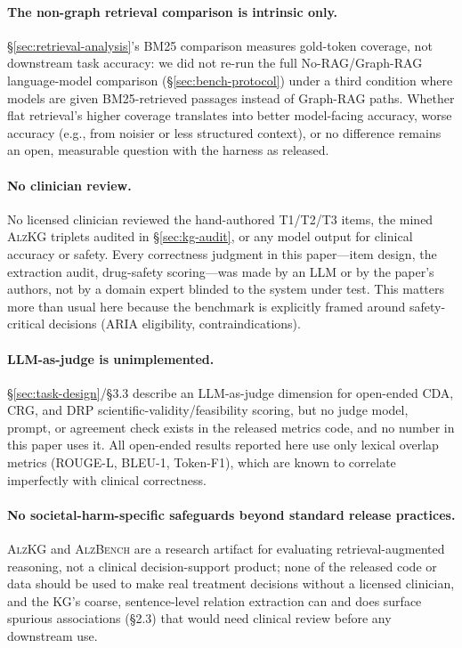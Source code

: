 \documentclass{article}
\begin{document}
\paragraph{The non-graph retrieval comparison is intrinsic only.} \S\ref{sec:retrieval-analysis}'s BM25 comparison measures gold-token coverage, not downstream task accuracy: we did not re-run the full No-RAG/Graph-RAG language-model comparison (\S\ref{sec:bench-protocol}) under a third condition where models are given BM25-retrieved passages instead of Graph-RAG paths. Whether flat retrieval's higher coverage translates into better model-facing accuracy, worse accuracy (e.g., from noisier or less structured context), or no difference remains an open, measurable question with the harness as released.

\paragraph{No clinician review.} No licensed clinician reviewed the hand-authored T1/T2/T3 items, the mined \textsc{AlzKG} triplets audited in \S\ref{sec:kg-audit}, or any model output for clinical accuracy or safety. Every correctness judgment in this paper---item design, the extraction audit, drug-safety scoring---was made by an LLM or by the paper's authors, not by a domain expert blinded to the system under test. This matters more than usual here because the benchmark is explicitly framed around safety-critical decisions (ARIA eligibility, contraindications).

\paragraph{LLM-as-judge is unimplemented.} \S\ref{sec:task-design}/\S3.3 describe an LLM-as-judge dimension for open-ended CDA, CRG, and DRP scientific-validity/feasibility scoring, but no judge model, prompt, or agreement check exists in the released metrics code, and no number in this paper uses it. All open-ended results reported here use only lexical overlap metrics (ROUGE-L, BLEU-1, Token-F1), which are known to correlate imperfectly with clinical correctness.

\paragraph{No societal-harm-specific safeguards beyond standard release practices.} \textsc{AlzKG} and \textsc{AlzBench} are a research artifact for evaluating retrieval-augmented reasoning, not a clinical decision-support product; none of the released code or data should be used to make real treatment decisions without a licensed clinician, and the KG's coarse, sentence-level relation extraction can and does surface spurious associations (\S2.3) that would need clinical review before any downstream use.
\end{document}

